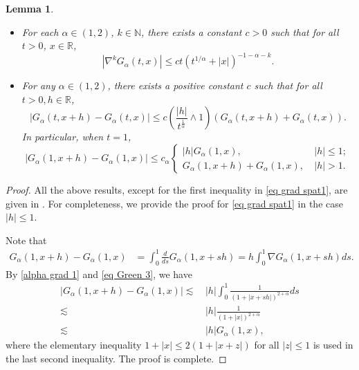 \documentclass[11pt,reqno]{amsart}
\numberwithin{equation}{section}
\newtheorem{lemma}{Lemma}[section]
\newcommand{\1}{{\bf 1}}
\newcommand{\2}{{\bf 2}}
\begin{document}
     \begin{lemma}\label{lem alpha esti1}  
  \begin{itemize}
\item[(a)]  For each $\alpha\in (1,2)$, $k\in \mathbb N$, there exists a constant $c>0$ such that for all $t>0$, $x\in \mathbb R$, 
  \begin{equation}\label{alpha grad 1}
\left|\nabla^k G_{\alpha} (t, x)\right| \le  c  t\left(t^{1/{\alpha}}+|x|\right)^{-1-\alpha-k}.
\end{equation}
 \item[(b)]
 For any $\alpha\in(1,2)$,   there exists a positive constant $c$  such that  for all $t>0, h\in\mathbb{R}$,
\begin{equation}\label{eq grad spat}
\left|G_{\alpha}(t,x+h)-G_{\alpha}(t,x)\right|\le c  \left(\frac{|h|}{t^{\frac{1}{\alpha}}}\wedge  1 \right) \left(G_{\alpha}(t,x+h)+G_{\alpha}(t,x)\right).
\end{equation}
In particular, when $t=1$,  
 \begin{equation}\label{eq grad spat1}
\left|G_{\alpha}(1, x+h)-G_{\alpha}(1, x)\right|\le c_{\alpha} \begin{cases}
|h|G_{\alpha}(1,x),&\  |h|\le 1;\\G_{\alpha}(1,x+h)+G_{\alpha}(1,x),&\  |h|> 1.

\end{cases}
\end{equation}
    \end{itemize}
   \end{lemma}
 
\begin{proof} All the above  results,  except for the first inequality in \eqref{eq grad spat1},  are given in \cite[Lemma 2.2]{CZ2016}.   For completeness, we provide the proof for \eqref{eq grad spat1} in the case  $|h|\le 1$. 

Note that 
   \begin{align*} 
   G_{\alpha}(1,x+h)-G_{\alpha}(1,x)&=\int_0^1 \frac{d}{ds}G_{\alpha}(1, x+s h)=h\int_0^1 \nabla G_{\alpha}(1, x+s h) ds.
\end{align*}
By \eqref{alpha grad 1} and \eqref{eq Green 3}, we have 
 \begin{align*}
 \left| G_{\alpha}(1, x+h)-G_{\alpha}(1, x) \right|
  \lesssim &\,  |h|\int_0^1\frac{1}{(1+|x+sh|)^{2+\alpha}}ds\\ 
\lesssim &\, |h|\frac{1}{(1+|x|)^{2+\alpha}}\\
\lesssim &\,  |h|G_{\alpha}(1,x),
\end{align*}
where   the elementary inequality $1+|x| \le   2 (1+|x+z|)$ for all $|z|\le 1$ is used in the last  second  inequality.
   The proof is complete.
\end{proof}
\end{document}
